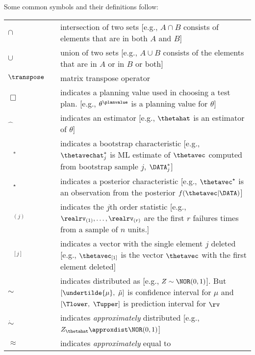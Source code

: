 Some common symbols and their definitions follow:

\begin{supertabular}{p{0.9in}lp{4.0in}}
$\cap$ &
& intersection of two sets [e.g., $A \cap B$ consists of
elements that are in both $A$ and $B$]
  \\
$\cup$ &
& union of two sets [e.g., $A \cup B$ consists of
the elements that are in $A$ or in $B$ or both]
  \\$\transpose$ &
& matrix transpose operator 
  \\
$\Box$ &
&indicates a planning value used in choosing 
a  test plan.
 [e.g., $\theta^{\planvalue}$ is a planning value for $\theta$]
   \\
$\widehat{\mbox{ }}$ &
&indicates an estimator
[e.g., $\thetahat$ is an estimator of $\theta$]
   \\
$\mbox{ }^{*}$ &
&indicates a bootstrap characteristic
[e.g., $\thetavechat^{*}_{j}$ is ML estimate
of $\thetavec$  computed from bootstrap sample $j$,
$\DATA^{*}_{j}$]
   \\
$\mbox{ }^{\star}$ &
&indicates a posterior characteristic
[e.g., $\thetavec^{\star}$ is an observation
from the posterior $f(\thetavec | \DATA)$]
    \\
$\mbox{ }_{(j)}$ &
&indicates the $j$th order statistic [e.g., $\realrv_{(1)}, \dots,
\realrv_{(r)}$ are the first $r$ failures times from a sample of $n$
units.]
\\
$\mbox{ }_{[j]}$ &
&indicates a vector with the single element $j$
deleted
[e.g., $\thetavec_{[1]}$ is the vector $\thetavec$ with the 
first element deleted]
       \\
$\sim$ &
&indicates distributed
as [e.g., $Z \sim \NOR(0,1)$]. But 
$[\undertilde{\mu}, \,\, \tilde{\mu}]$ is confidence
interval for $\mu$ and 
$[\Tlower, \,\, \Tupper]$ is prediction
interval for $\rv$
       \\
$\dot{\sim}$ &
&indicates {\em approximately} distributed
[e.g., $Z_{\thetahat} \approxdist \NOR(0,1)$]
   \\
$\approx$ &
&indicates {\em approximately} equal to

\end{supertabular}
